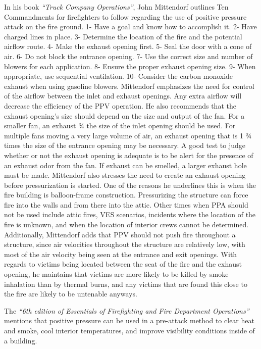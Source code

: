 \documentclass{article}
\begin{document}
In his book \textit{``Truck Company Operations''}, John Mittendorf outlines Ten Commandments for firefighters to follow regarding the use of positive pressure attack on the fire ground. 1- Have a goal and know how to accomplish it. 2- Have charged lines in place. 3- Determine the location of the fire and the potential airflow route. 4- Make the exhaust opening first. 5- Seal the door with a cone of air. 6- Do not block the entrance opening. 7- Use the correct size and number of blowers for each application. 8- Ensure the proper exhaust opening size. 9- When appropriate, use sequential ventilation. 10- Consider the carbon monoxide exhaust when using gasoline blowers. Mittendorf emphasizes the need for control of the airflow between the inlet and exhaust openings. Any extra airflow will decrease the efficiency of the PPV operation. He also recommends that the exhaust opening’s size should depend on the size and output of the fan. For a smaller fan, an exhaust ¾ the size of the inlet opening should be used. For multiple fans moving a very large volume of air, an exhaust opening that is 1 ¾ times the size of the entrance opening may be necessary. A good test to judge whether or not the exhaust opening is adequate is to be alert for the presence of an exhaust odor from the fan. If exhaust can be smelled, a larger exhaust hole must be made. Mittendorf also stresses the need to create an exhaust opening before pressurization is started. One of the reasons he underlines this is when the fire building is balloon-frame construction. Pressurizing the structure can force fire into the walls and from there into the attic. Other times when PPA should not be used include attic fires, VES scenarios, incidents where the location of the fire is unknown, and when the location of interior crews cannot be determined. Additionally, Mittendorf adds that PPV should not push fire throughout a structure, since air velocities throughout the structure are relatively low, with most of the air velocity being seen at the entrance and exit openings. With regards to victims being located between the seat of the fire and the exhaust opening, he maintains that victims are more likely to be killed by smoke inhalation than by thermal burns, and any victims that are found this close to the fire are likely to be untenable anyways.\cite{TruckCoOps}

The \textit{``6th edition of Essentials of Firefighting and Fire Department Operations''} mentions that positive pressure can be used in a pre-attack method to clear heat and smoke, cool interior temperatures, and improve visibility conditions inside of a building.\cite{IFSTAESS}
\end{document}
